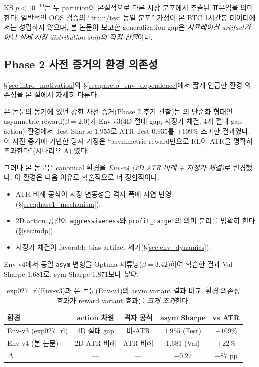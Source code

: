 \documentclass[11pt, a4paper]{article}
\begin{document}
KS $p < 10^{-10}$는 두 partition이 본질적으로 다른 시장 분포에서 추출된 표본임을
의미한다. 일반적인 OOS 검증의 ``train/test 동일 분포'' 가정이 본 BTC 1시간봉
데이터에서는 성립하지 않으며, 본 논문이 보고한 generalization gap은
\emph{시뮬레이션 artifact가 아닌 실제 시장 distribution shift의 직접 산물}이다.

\subsection{Phase 2 사전 증거의 환경 의존성}
\label{sec:disc_env_dependence}

\S\ref{sec:intro_motivation}와 \S\ref{sec:pareto_env_dependence}에서 짧게
언급한 환경 의존성을 본 절에서 자세히 다룬다.

본 논문의 동기에 있던 강한 사전 증거(Phase 2 후기 관찰)는
\citet{kahneman1979prospect}의 단순화 형태인 asymmetric reward($\beta=2.0$)가
Env-v3(4D 절대 gap, 지정가 체결, 4개 절대 gap action) 환경에서 Test Sharpe
$1.955$로 ATR Test $0.935$를 $+109\%$ 초과한 결과였다. 이 사전 증거에 기반한
당시 가정은 ``asymmetric reward만으로 RL이 ATR을 명확히 초과한다''(시나리오 A)
였다.

그러나 본 논문은 canonical 환경을 \emph{Env-v4 (2D ATR 비례 + 지정가 체결)}로
변경했다. 이 환경은 다음 이유로 학술적으로 더 정합적이다:
\begin{itemize}[leftmargin=*]
\item ATR 비례 공식이 시장 변동성을 격자 폭에 자연 반영(\S\ref{sec:phase1_mechanism}).
\item 2D action 공간이 \texttt{aggressiveness}와 \texttt{profit\_target}의
의미 분리를 명확히 한다(\S\ref{sec:mdp}).
\item 지정가 체결이 favorable bias artifact 제거(\S\ref{sec:env_dynamics}).
\end{itemize}

Env-v4에서 동일 \texttt{asym} 변형을 Optuna 재튜닝($\beta=3.42$)하여 학습한
결과 Val Sharpe $1.681$로, sym Sharpe $1.871$보다 \emph{낮다}.

\begin{table}[!htbp]
\centering
\caption{exp027\_rl(Env-v3)과 본 논문(Env-v4)의 asym variant 결과 비교. 환경
의존성 효과가 reward variant 효과를 \emph{크게 초과}한다.}
\begin{tabular}{lcccc}
\toprule
환경 & action 차원 & 격자 공식 & asym Sharpe & vs ATR \\
\midrule
Env-v3 (exp027\_rl) & 4D 절대 gap & 비-ATR & $1.955$ (Test) & $+109\%$ \\
Env-v4 (본 논문) & 2D ATR 비례 & ATR 비례 & $1.681$ (Val) & $+22\%$ \\
\midrule
$\Delta$ & --- & --- & $-0.27$ & $-87$ pp \\
\bottomrule
\end{tabular}
\label{tab:disc_env_dependence}
\end{table}
\end{document}
